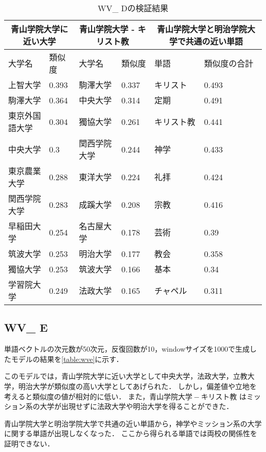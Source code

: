 \begin{table}[H]
\caption{WV\_ Dの検証結果}
\centering
\footnotesize
\begin{tabular}{ll|ll|ll}
\hline
\multicolumn{2}{c}{青山学院大学に近い大学} & \multicolumn{2}{c}{青山学院大学 - キリスト教} & \multicolumn{2}{c}{青山学院大学と明治学院大学で共通の近い単語}
\\ \hline
大学名 & 類似度 & 大学名 & 類似度 & 単語 & 類似度の合計
\\ \hline \hline
上智大学 & 0.393 & 駒澤大学 & 0.337 & キリスト & 0.493\\
駒澤大学 & 0.364 & 中央大学 & 0.314 & 定期 & 0.491\\
東京外国語大学 & 0.304 & 獨協大学 & 0.261 & キリスト教 & 0.441\\
中央大学 & 0.3 & 関西学院大学 & 0.244 & 神学 & 0.433\\
東京農業大学 & 0.288 & 東洋大学 & 0.224 & 礼拝 & 0.424\\
関西学院大学 & 0.283 & 成蹊大学 & 0.208 & 宗教 & 0.416\\
早稲田大学 & 0.254 & 名古屋大学 & 0.178 & 芸術 & 0.39\\
筑波大学 & 0.253 & 明治大学 & 0.177 & 教会 & 0.358\\
獨協大学 & 0.253 & 筑波大学 & 0.166 & 基本 & 0.34\\
学習院大学 & 0.249 & 法政大学 & 0.165 & チャペル & 0.311\\ \hline
\end{tabular}
\label{table:wvd}
\end{table}

\subsection{WV\_ E}
単語ベクトルの次元数が50次元，反復回数が10，windowサイズを1000で生成したモデルの結果を\ref{table:wve}に示す．

このモデルでは，青山学院大学に近い大学として中央大学，法政大学，立教大学，明治大学が類似度の高い大学としてあげられた．
しかし，偏差値や立地を考えると類似度の値が相対的に低い．
また，$ 青山学院大学 - キリスト教 $ はミッション系の大学が出現せずに法政大学や明治大学を得ることができた．

青山学院大学と明治学院大学で共通の近い単語から，神学やミッション系の大学に関する単語が出現しなくなった．
ここから得られる単語では両校の関係性を証明できない．

